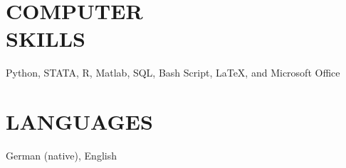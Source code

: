 \documentclass[margin, 12pt]{res} %
\begin{document}
\begin{resume}
		\section{COMPUTER \\ SKILLS} 
		
		Python, STATA, R, Matlab, SQL, Bash Script, LaTeX, and Microsoft Office
		
		
		
		\section{LANGUAGES}
		
		German (native), English

		
	\end{resume}
\end{document}
